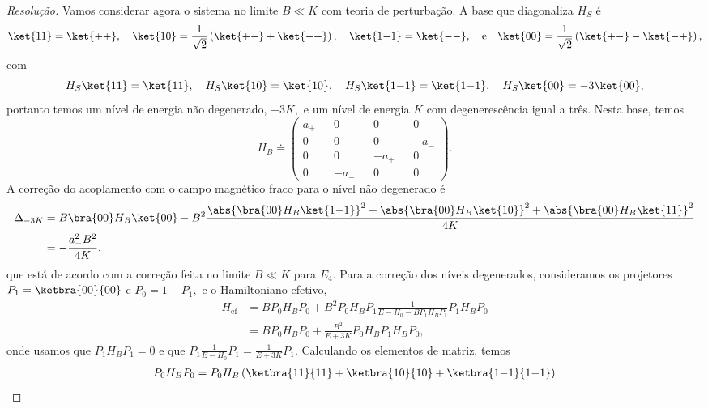 \begin{proof}[Resolução]
   Vamos considerar agora o sistema no limite \(B \ll K\) com teoria de perturbação. 
   A base que diagonaliza \(H_S\) é
   \begin{equation*}
      \ket{11} = \ket{++},\quad
      \ket{10} = \frac{1}{\sqrt{2}}\left(\ket{+-} + \ket{-+}\right),\quad
      \ket{1{-1}} = \ket{--},\quad\text{e}\quad
      \ket{00} = \frac{1}{\sqrt{2}} \left(\ket{+-} - \ket{-+}\right),
   \end{equation*}
   com
   \begin{equation*}
      H_S\ket{11} = \ket{11},\quad
      H_S\ket{10} = \ket{10},\quad
      H_S\ket{1{-1}} = \ket{1{-1}},\quad
      H_S\ket{00} = -3 \ket{00},
   \end{equation*}
   portanto temos um nível de energia não degenerado, \(-3K,\) e um nível de energia \(K\) com degenerescência igual a três. Nesta base, temos
   \begin{equation*}
       H_B \doteq \begin{pmatrix}
          a_+ && 0 && 0 && 0\\
          0 && 0 && 0 && -a_-\\
          0 && 0 && -a_+ && 0\\
          0 && -a_- && 0 && 0
       \end{pmatrix}.
   \end{equation*}
   A correção do acoplamento com o campo magnético fraco para o nível não degenerado é
   \begin{align*}
      \Delta_{-3K} &= B\bra{00} H_B\ket{00} - B^2 \frac{\abs{\bra{00}H_B\ket{1{-1}}}^2 +\abs{\bra{00}H_B\ket{10}}^2 +\abs{\bra{00}H_B\ket{11}}^2}{4K}\\
                   &= -\frac{a_-^2B^2}{4K},
   \end{align*}
   que está de acordo com a correção feita no limite \(B \ll K\) para \(E_4.\) Para a correção dos níveis degenerados, consideramos os projetores \(P_1 = \ketbra{00}{00}\) e \(P_0 = 1 - P_1,\) e o Hamiltoniano efetivo,
   \begin{align*}
      H_\mathrm{ef} &= B P_0 H_B P_0 + B^2 P_0 H_B P_1 \frac{1}{E - H_0 - B P_1 H_B P_1} P_1 H_B P_0\\
                    &= B P_0 H_B P_0 + \frac{B^2}{E + 3K} P_0 H_B P_1 H_B P_0,
   \end{align*}
   onde usamos que \(P_1 H_B P_1 = 0\) e que \(P_1\frac{1}{E - H_0} P_1 = \frac{1}{E + 3K} P_1.\) Calculando os elementos de matriz, temos
   \begin{align*}
      P_0 H_B P_0 &= P_0 H_B \left(\ketbra{11}{11} + \ketbra{10}{10} + \ketbra{1{-1}}{1{-1}}\right)\\

\end{align*}
\end{proof}
